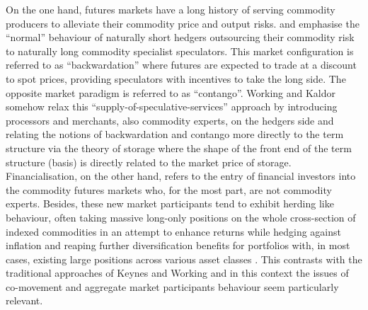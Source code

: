 \documentclass[
  authoryear,
  preprint,
  3p]{elsarticle}
\begin{document}
\bigskip
\bigskip

On the one hand, futures markets have a long history of serving
commodity producers to alleviate their commodity price and output risks.
\citet{keynes_treatise_1930} and \citet{hicks_value_1939} emphasise the
``normal'' behaviour of naturally short hedgers outsourcing their
commodity risk to naturally long commodity specialist speculators. This
market configuration is referred to as ``backwardation'' where futures
are expected to trade at a discount to spot prices, providing
speculators with incentives to take the long side. The opposite market
paradigm is referred to as ``contango''. Working
\citep{working_price_1933, working_theory_1948, working_hedging_1953}
and Kaldor \citep{kaldor_speculation_1939} somehow relax this
``supply-of-speculative-services'' \citep{till_long_2007} approach by
introducing processors and merchants, also commodity experts, on the
hedgers side and relating the notions of backwardation and contango more
directly to the term structure via the theory of storage where the shape
of the front end of the term structure (basis) is directly related to
the market price of storage.\\
Financialisation, on the other hand, refers to the entry of financial
investors into the commodity futures markets who, for the most part, are
not commodity experts. Besides, these new market participants tend to
exhibit herding like behaviour, often taking massive long-only positions
on the whole cross-section of indexed commodities in an attempt to
enhance returns while hedging against inflation and reaping further
diversification benefits for portfolios with, in most cases, existing
large positions across various asset classes
\citep{brunetti_speculators_2016, boyd_prevalence_2016, cheng_convective_2014, juvenal_speculation_2015, singleton_investor_2013, tang_index_2012}.
This contrasts with the traditional approaches of Keynes and Working and
in this context the issues of co-movement and aggregate market
participants behaviour seem particularly relevant.

\medskip
\end{document}
